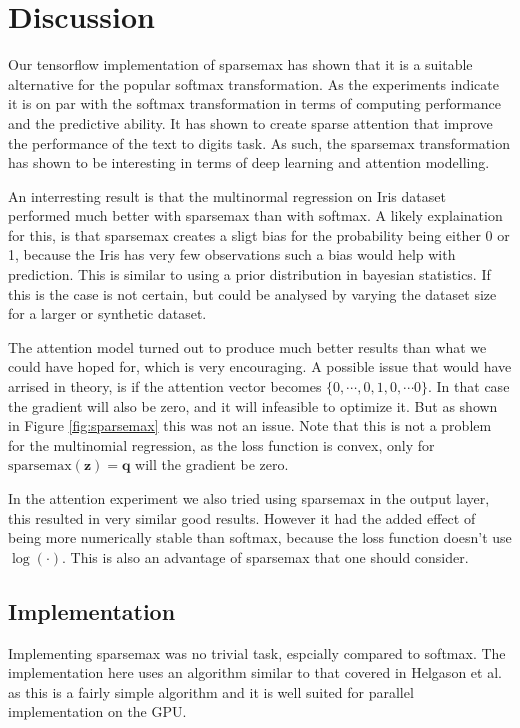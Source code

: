 \section{Discussion}
Our tensorflow implementation of sparsemax has shown that it is a suitable alternative for the popular softmax transformation. As the experiments indicate it is on par with the softmax transformation in terms of computing performance and the predictive ability.
It has shown to create sparse attention that improve the performance of the text to digits task. As such, the sparsemax transformation has shown to be interesting in terms of deep learning and attention modelling.

An interresting result is that the multinormal regression on Iris dataset performed much better with sparsemax than with softmax. A likely explaination for this, is that sparsemax creates a sligt bias for the probability being either 0 or 1, because the Iris has very few observations such a bias would help with prediction. This is similar to using a prior distribution in bayesian statistics. If this is the case is not certain, but could be analysed by varying the dataset size for a larger or synthetic dataset.

The attention model turned out to produce much better results than what we could have hoped for, which is very encouraging. A possible issue that would have arrised in theory, is if the attention vector becomes $\{0, \cdots, 0, 1, 0, \cdots 0\}$. In that case the gradient will also be zero, and it will infeasible to optimize it. But as shown in Figure \ref{fig:sparsemax} this was not an issue. Note that this is not a problem for the multinomial regression, as the loss function is convex, only for $\mathrm{sparsemax}(\mathbf{z}) = \mathbf{q}$ will the gradient be zero.

In the attention experiment we also tried using sparsemax in the output layer, this resulted in very similar good results. However it had the added effect of being more numerically stable than softmax, because the loss function doesn't use $\log(\cdot)$. This is also an advantage of sparsemax that one should consider.

\subsection{Implementation}
Implementing sparsemax was no trivial task, espcially compared to softmax. The implementation here uses an algorithm similar to that covered in Helgason et al. \cite{Helgason1980} as this is a fairly simple algorithm and it is well suited for parallel implementation on the GPU.

